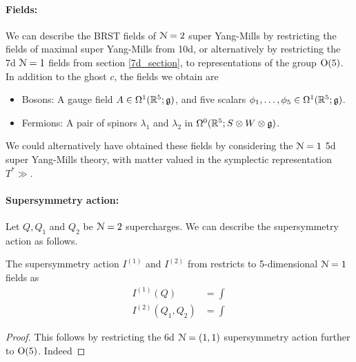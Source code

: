 \documentclass[10pt, oneside]{article}
\begin{document}
\paragraph{Fields:} We can describe the BRST fields of $\mathcal{N}=2$ super Yang-Mills by restricting the fields of maximal super Yang-Mills from 10d, or alternatively by restricting the 7d $\mathcal{N}=1$ fields from section \ref{7d_section}, to representations of the group $\mathrm{O}(5)$.  In addition to the ghost $c$, the fields we obtain are
\begin{itemize}
 \item Bosons: A gauge field $A \in \Omega^1(\mathbb R^5; \mathfrak{g})$, and five scalars $\phi_1 ,\ldots, \phi_5 \in \Omega^1(\mathbb R^5; \mathfrak{g})$.
 \item Fermions: A pair of spinors $\lambda_1$ and $\lambda_2$ in $\Omega^0(\mathbb R^5; S \otimes W \otimes \mathfrak{g})$.
\end{itemize}
We could alternatively have obtained these fields by considering the $\mathcal{N}=1$ 5d super Yang-Mills theory, with matter valued in the symplectic representation $T^*\gg$.

\vspace{-10pt}
\paragraph{Supersymmetry action:} Let $Q, Q_1$ and $Q_2$ be $\mathcal{N}=2$ supercharges.  We can describe the supersymmetry action as follows.
\begin{prop}
The supersymmetry action $I^{(1)}$ and $I^{(2)}$ from  restricts to 5-dimensional $\mathcal{N}=1$ fields as
\begin{align*}
I^{(1)}(Q) &= \int \\
I^{(2)}(Q_1,Q_2) &= \int 
\end{align*}
\end{prop}

\begin{proof}
This follows by restricting the 6d $\mathcal{N}=(1,1)$ supersymmetry action further to $\mathrm{O}(5)$.  Indeed 
\end{proof}

\vspace{-10pt}
\end{document}
